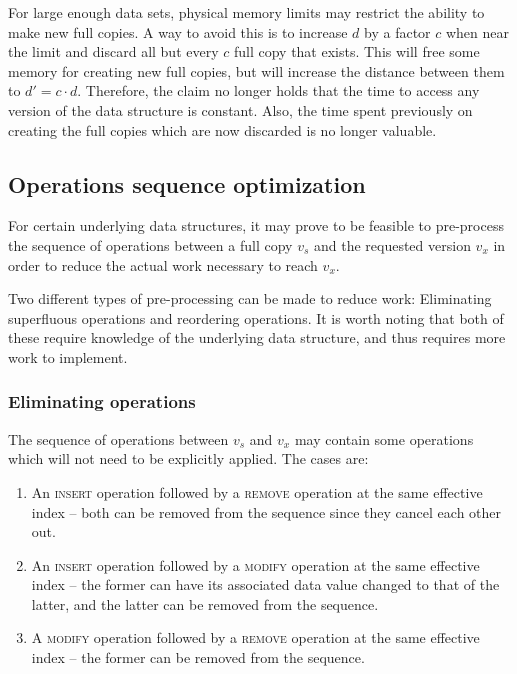For large enough data sets, physical memory limits may restrict the ability to
make new full copies. A way to avoid this is to increase $d$ by a factor $c$
when near the limit and discard all but every $c$ full copy that exists. This
will free some memory for creating new full copies, but will increase the
distance between them to $d' = c \cdot d$. Therefore, the claim no longer holds
that the time to access any version of the data structure is constant. Also, the
time spent previously on creating the full copies which are now discarded is no
longer valuable.

\subsection{Operations sequence optimization}
For certain underlying data structures, it may prove to be feasible to
pre-process the sequence of operations between a full copy $v_s$ and the
requested version $v_x$ in order to reduce the actual work necessary to reach
$v_x$.

Two different types of pre-processing can be made to reduce work: Eliminating
superfluous operations and reordering operations. It is worth noting that both
of these require knowledge of the underlying data structure, and thus requires
more work to implement.

\subsubsection{Eliminating operations}
The sequence of operations between $v_s$ and $v_x$ may contain some operations
which will not need to be explicitly applied. The cases are:
\begin{enumerate}
  \item An \textsc{insert} operation followed by a \textsc{remove} operation at
  the same effective index -- both can be removed from the sequence since they
  cancel each other out.
  \label{item:elop-insert-remove}

  \item An \textsc{insert} operation followed by a \textsc{modify} operation at
  the same effective index -- the former can have its associated data value
  changed to that of the latter, and the latter can be removed from the
  sequence.
  \label{item:elop-insert-modify}

  \item A \textsc{modify} operation followed by a \textsc{remove} operation at
  the same effective index -- the former can be removed from the sequence.
  \label{item:elop-modify-remove}
\end{enumerate}

